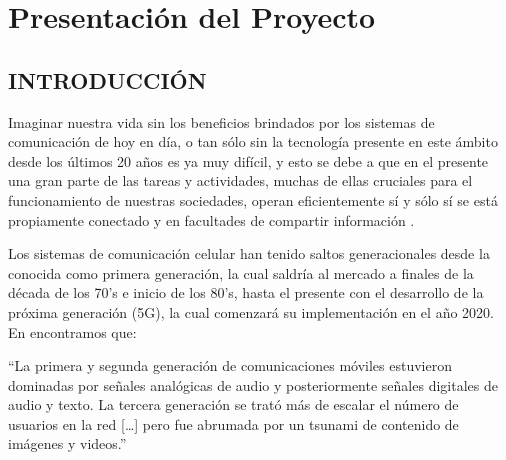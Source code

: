 
\chapter{Presentación del Proyecto} %

\label{Chapter1} %


\newcommand{\keyword}[1]{\textbf{#1}}
\newcommand{\tabhead}[1]{\textbf{#1}}
\newcommand{\code}[1]{\texttt{#1}}
\newcommand{\file}[1]{\texttt{\bfseries#1}}
\newcommand{\option}[1]{\texttt{\itshape#1}}


\section{INTRODUCCIÓN}

Imaginar nuestra vida sin los beneficios brindados por los sistemas de comunicación de hoy en día, o tan sólo sin la tecnología presente en este ámbito desde los últimos 20 años es ya muy difícil, y esto se debe a que en el presente una gran parte de las tareas y actividades, muchas de ellas cruciales para el funcionamiento de nuestras sociedades, operan eficientemente sí y sólo sí se está propiamente conectado y en facultades de compartir información \parencite{Fettweis2014}.\newline

Los sistemas de comunicación celular han tenido saltos generacionales desde la conocida como primera generación, la cual saldría al mercado a finales de la década de los 70’s e inicio de los 80’s, hasta el presente con el desarrollo de la próxima generación (5G), la cual comenzará su implementación en el año 2020. En \parencite{Fettweis2014} encontramos que:\newline

\hspace*{10mm} {“La primera y segunda generación de comunicaciones móviles estuvieron dominadas por señales analógicas de audio y posteriormente señales digitales de audio y texto. La tercera generación se trató más de escalar el número de usuarios en la red […] pero fue abrumada por un tsunami de contenido de imágenes y videos.”}\newline

